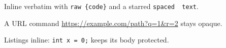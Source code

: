Inline verbatim with \verb|raw {code}| and a starred \verb*|spaced  text|.

A URL command \url{https://example.com/path?q=1&r=2} stays opaque.

Listings inline: \lstinline{int x = 0;} keeps its body protected.
